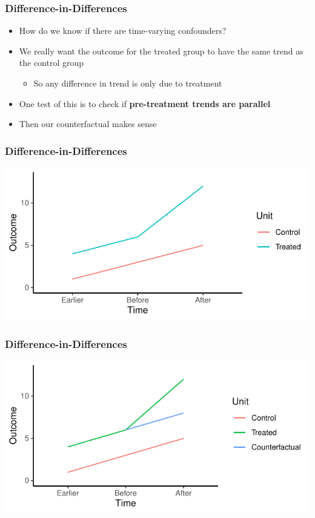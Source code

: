 \documentclass[xcolor=x11names,compress]{beamer}\usepackage[]{graphicx}\usepackage[]{color}
\makeatletter
\def\maxwidth{ %
  \ifdim\Gin@nat@width>\linewidth
    \linewidth
  \else
    \Gin@nat@width
  \fi
}
\newenvironment{knitrout}{}{} %
\renewcommand{\(}{\begin{columns}}
\renewcommand{\)}{\end{columns}}
\newcommand{\<}[1]{\begin{column}{#1}}
\renewcommand{\>}{\end{column}}
\makeatother
\begin{document}
\begin{frame}
\frametitle{Difference-in-Differences}
\begin{itemize}
\item How do we know if there are time-varying confounders?
\pause
\item We really want the outcome for the treated group to have the same trend as the control group
\pause
\begin{itemize}
\item So any difference in trend is only due to treatment
\pause
\end{itemize}
\item One test of this is to check if \textbf{pre-treatment trends are parallel}
\pause
\item Then our counterfactual makes sense
\end{itemize}
\end{frame}

\begin{frame}
\frametitle{Difference-in-Differences}
\begin{knitrout}
\color{fgcolor}
\includegraphics[width=\maxwidth]{figure/DinD_chart6-1} 

\end{knitrout}
\end{frame}

\begin{frame}
\frametitle{Difference-in-Differences}
\begin{knitrout}
\color{fgcolor}
\includegraphics[width=\maxwidth]{figure/DinD_chart7-1} 

\end{knitrout}
\end{frame}
\end{document}
